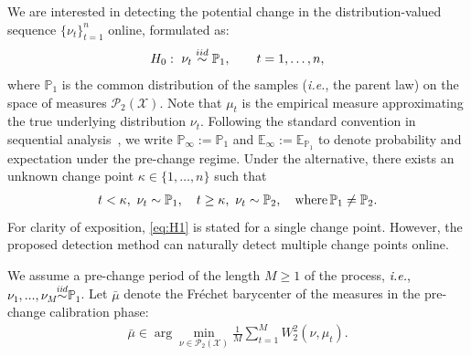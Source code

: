 \documentclass{article}
\newcommand{\ie}{\textit{i.e.}, \xspace}
\newcommand{\rev}[1]{\textcolor{black}{#1}}
\theoremstyle{plain}
\theoremstyle{definition}
\theoremstyle{remark}
\begin{document}
We are interested in detecting the potential change in the distribution-valued sequence $\{\nu_t\}_{t=1}^{n}$ online, formulated as:
\begin{align}
\rev{H_0: \ \nu_t \stackrel{iid}{\sim} \mathbb{P}_1, \qquad t=1,\ldots,n,}  \label{eq:H0}
\end{align} %
where $\mathbb{P}_1$ is the common distribution of the samples (\ie the parent law) on the space of measures $\mathcal{P}_2(\mathcal{X})$. Note that $\mu_t$ is the empirical measure approximating the true underlying distribution $\nu_t$. Following the standard convention in sequential analysis~\citep{page1954continuous,truong2020selective}, we write $\mathbb{P}_\infty:=\mathbb{P}_1$ and $\mathbb{E}_\infty:=\mathbb{E}_{\mathbb{P}_1}$ to denote probability and expectation under the pre-change regime.
Under the alternative, there exists an unknown change point $\kappa\in\{1,\ldots,n\}$ such that
\begin{align}
\rev{t < \kappa,\ \nu_t \sim \mathbb{P}_1,\quad t\geq \kappa,\ \nu_t \sim \mathbb{P}_2, \quad \operatorname{where } \mathbb{P}_1 \neq \mathbb{P}_2.}\label{eq:H1}
\end{align}
For clarity of exposition, \cref{eq:H1} is stated for a single change point.
However, the proposed detection method can naturally detect multiple change points online.



We assume a pre-change period of the length $M\ge 1$ of the process, \rev{\ie $\nu_1,\dots,\nu_M \stackrel{iid}{\sim}\mathbb{P}_1$}.
Let $\bar{\mu}$ denote the Fr\'echet barycenter of the measures in the pre-change calibration phase:
\begin{align}
\bar{\mu}\in\arg\min_{\nu\in\mathcal{P}_2(\mathcal{X})} \frac{1}{M}\sum_{t=1}^{M} W_2^2(\nu,\mu_t).
\label{eq:barycenter}
\end{align}
\end{document}

